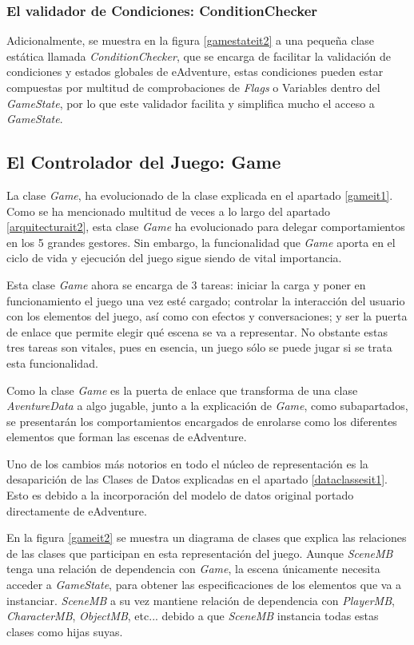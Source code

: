 \subsubsection{El validador de Condiciones: ConditionChecker}

Adicionalmente, se muestra en la figura \ref{gamestateit2} a una pequeña clase estática llamada \textit{ConditionChecker}, que se encarga de facilitar la validación de condiciones y estados globales de eAdventure, estas condiciones pueden estar compuestas por multitud de comprobaciones de \textit{Flags} o Variables dentro del \textit{GameState}, por lo que este validador facilita y simplifica mucho el acceso a \textit{GameState}.

\subsection{El Controlador del Juego: Game}
\label{gamesectionit2}

La clase \textit{Game}, ha evolucionado de la clase explicada en el apartado \ref{gameit1}. Como se ha mencionado multitud de veces a lo largo del apartado \ref{arquitecturait2}, esta clase \textit{Game} ha evolucionado para delegar comportamientos en los 5 grandes gestores. Sin embargo, la funcionalidad que \textit{Game} aporta en el ciclo de vida y ejecución del juego sigue siendo de vital importancia.

Esta clase \textit{Game} ahora se encarga de 3 tareas: iniciar la carga y poner en funcionamiento el juego una vez esté cargado; controlar la interacción del usuario con los elementos del juego, así como con efectos y conversaciones; y ser la puerta de enlace que permite elegir qué escena se va a representar. No obstante estas tres tareas son vitales, pues en esencia, un juego sólo se puede jugar si se trata esta funcionalidad.

Como la clase \textit{Game} es la puerta de enlace que transforma de una clase \textit{AventureData} a algo jugable, junto a la explicación de \textit{Game}, como subapartados, se presentarán los comportamientos encargados de enrolarse como los diferentes elementos que forman las escenas de eAdventure.

Uno de los cambios más notorios en todo el núcleo de representación es la desaparición de las Clases de Datos explicadas en el apartado \ref{dataclassesit1}. Esto es debido a la incorporación del modelo de datos original portado directamente de eAdventure.

En la figura \ref{gameit2} se muestra un diagrama de clases que explica las relaciones de las clases que participan en esta representación del juego. Aunque \textit{SceneMB} tenga una relación de dependencia con \textit{Game}, la escena únicamente necesita acceder a \textit{GameState}, para obtener las especificaciones de los elementos que va a instanciar. \textit{SceneMB} a su vez mantiene relación de dependencia con \textit{PlayerMB}, \textit{CharacterMB}, \textit{ObjectMB}, etc... debido a que \textit{SceneMB} instancia todas estas clases como hijas suyas.


